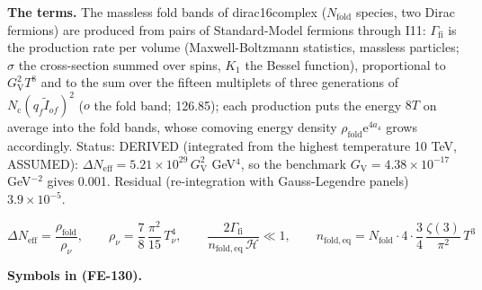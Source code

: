 \documentclass[
  10pt,
]{article}
\begin{document}
\textbf{The terms.} The massless fold bands of dirac16complex
(\(N_{\mathrm{fold}}\) species, two Dirac fermions) are produced from
pairs of Standard-Model fermions through I11: \(\Gamma_{\mathrm{fi}}\)
is the production rate per volume (Maxwell-Boltzmann statistics,
massless particles; \(\sigma\) the cross-section summed over spins,
\(K_1\) the Bessel function), proportional to \(G_{\mathrm{V}}^2T^8\)
and to the sum over the fifteen multiplets of three generations of
\(N_{\mathrm{c}}(q_f\tilde I_{of})^2\) (\(o\) the fold band; 126.85);
each production puts the energy \(8T\) on average into the fold bands,
whose comoving energy density \(\rho_{\mathrm{fold}}\mathrm{e}^{4a_4}\)
grows accordingly. Status: DERIVED (integrated from the highest
temperature 10 TeV, ASSUMED):
\(\Delta N_{\mathrm{eff}} = 5.21\times10^{29}\,G_{\mathrm{V}}^2\)
GeV\(^4\), so the benchmark \(G_{\mathrm{V}} = 4.38\times10^{-17}\)
GeV\(^{-2}\) gives 0.001. Residual (re-integration with Gauss-Legendre
panels) \(3.9\times10^{-5}\).

\[
\Delta N_{\mathrm{eff}} = \frac{\rho_{\mathrm{fold}}}{\rho_\nu},\qquad \rho_\nu =
 \frac78\,\frac{\pi^2}{15}\,T_\nu^4,\qquad
\frac{2\Gamma_{\mathrm{fi}}}{n_{\mathrm{fold,eq}}\,\mathcal{H}} \ll 1,\qquad
n_{\mathrm{fold,eq}} = N_{\mathrm{fold}}\cdot4\cdot\frac34\,\frac{\zeta(3)}{\pi^2}\,T^3 \tag{FE-130}
\]

\textbf{Symbols in (FE-130).}
\end{document}
